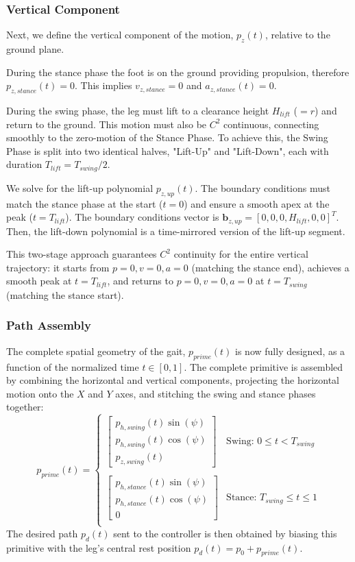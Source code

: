 \subsubsection{Vertical Component}

Next, we define the vertical component of the motion, $p_z(t)$, relative to the ground plane.

During the stance phase the foot is on the ground providing propulsion, therefore $p_{z,stance}(t) = 0$. This
implies $v_{z,stance} = 0$ and $a_{z,stance}(t) = 0$.

During the swing phase, the leg must lift to a clearance height $H_{lift}$ ($= r$) and return to the ground.
This motion must also be $C^2$ continuous, connecting smoothly to the zero-motion of the Stance Phase. To
achieve this, the Swing Phase is split into two identical halves, "Lift-Up" and "Lift-Down", each with duration
$T_{lift} = T_{swing} / 2$.

We solve for the lift-up polynomial $p_{z,up}(t)$. The boundary conditions must match the stance phase at the
start ($t = 0$) and ensure a smooth apex at the peak ($t = T_{lift}$). The boundary conditions vector is
$\mathbf{b}_{z,up} = [0, 0, 0, H_{lift}, 0, 0]^T$. Then, the lift-down polynomial is a time-mirrored version of
the lift-up segment.

This two-stage approach guarantees $C^2$ continuity for the entire vertical trajectory: it starts from
$p=0, v=0, a=0$ (matching the stance end), achieves a smooth peak at $t = T_{lift}$, and returns to
$p=0, v=0, a=0$ at $t = T_{swing}$ (matching the stance start).


\subsubsection{Path Assembly}

The complete spatial geometry of the gait, $p_{prime}(t)$ is now fully designed, as a function of the
normalized time $t \in [0, 1]$. The complete primitive is assembled by combining the horizontal and vertical
components, projecting the horizontal motion onto the $X$ and $Y$ axes, and stitching the swing and stance
phases together:
$$
p_{prime}(t) =
  \begin{cases}
    \begin{bmatrix}
      p_{h,swing}(t) \sin(\psi) \\
      p_{h,swing}(t) \cos(\psi) \\
      p_{z,swing}(t)
    \end{bmatrix}
    & \text{Swing: } 0 \le t < T_{swing} \\
    \\
    \begin{bmatrix}
      p_{h,stance}(t) \sin(\psi) \\
      p_{h,stance}(t) \cos(\psi) \\
      0
    \end{bmatrix}
    & \text{Stance: } T_{swing} \le t \le 1 \\
  \end{cases}
$$
The desired path $p_d(t)$ sent to the controller is then obtained by biasing this primitive with the
leg's central rest position $p_d(t) = p_0 + p_{prime}(t)$.


